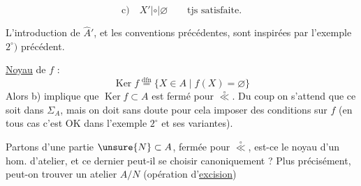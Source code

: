 
\[
\text{c)}\quad X'\mathrel{|\circ|}\varnothing\qquad\text{tjs satisfaite.}
\]

L'introduction de $\widehat{A}'$, et les conventions précédentes, sont inspirées par l'exemple $2^\circ)$ précédent.

\uline{Noyau} de $f$ :
\[
\operatorname{Ker} f\overset{\mathrm{dfn}}{=}\{X\in A\mid f(X)=\varnothing\}
\]
Alors b) implique que $\operatorname{Ker} f\subset A$ est fermé pour $\overset{\circ}{\ll}$. Du coup on s'attend que ce soit dans $\Sigma_A$, mais on doit sans doute pour cela imposer des conditions  sur $f$ (en tous cas c'est OK dans l'exemple $2^\circ$ et ses variantes).

Partons d'une partie $\unsure{N}\subset A$, fermée pour $\overset{\circ}{\ll}$, est-ce le noyau d'un hom. d'atelier, et ce dernier peut-il se choisir canoniquement ? Plus précisément, peut-on trouver un atelier $A/N$ (opération d'\uline{excision})
